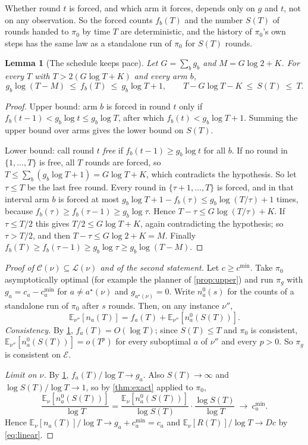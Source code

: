 \documentclass[11pt,a4paper]{article}
\theoremstyle{plain}
\newtheorem{lemma}[theorem]{Lemma}
\theoremstyle{definition}
\theoremstyle{remark}
\newcommand{\E}{\mathbb{E}}
\newcommand{\cmin}{c^{\min}}
\newcommand{\astar}{a^\star}
\newcommand{\Env}{\mathcal{E}}
\begin{document}
Whether round $t$ is forced, and which arm it forces, depends only on $g$ and $t$, not on any observation. So the forced counts $f_b(T)$ and the number $S(T)$ of rounds handed to $\pi_0$ by time $T$ are deterministic, and the history of $\pi_0$'s own steps has the same law as a standalone run of $\pi_0$ for $S(T)$ rounds.

\begin{lemma}[The schedule keeps pace]\label{lem:schedule}
Let $G=\sum_bg_b$ and $M=G\log2+K$. For every $T$ with $T>2(G\log T+K)$ and every arm $b$,
\[
  g_b\log(T-M)\ \le\ f_b(T)\ \le\ g_b\log T+1,\qquad T-G\log T-K\ \le\ S(T)\ \le\ T.
\]
\end{lemma}

\begin{proof}
Upper bound: arm $b$ is forced in round $t$ only if $f_b(t-1)<g_b\log t\le g_b\log T$, after which $f_b(t)<g_b\log T+1$. Summing the upper bound over arms gives the lower bound on $S(T)$.

Lower bound: call round $t$ \emph{free} if $f_b(t-1)\ge g_b\log t$ for all $b$. If no round in $\{1,\dots,T\}$ is free, all $T$ rounds are forced, so $T\le\sum_b(g_b\log T+1)=G\log T+K$, which contradicts the hypothesis. So let $\tau\le T$ be the last free round. Every round in $\{\tau+1,\dots,T\}$ is forced, and in that interval arm $b$ is forced at most $g_b\log T+1-f_b(\tau)\le g_b\log(T/\tau)+1$ times, because $f_b(\tau)\ge f_b(\tau-1)\ge g_b\log\tau$. Hence $T-\tau\le G\log(T/\tau)+K$. If $\tau\le T/2$ this gives $T/2\le G\log T+K$, again contradicting the hypothesis; so $\tau>T/2$, and then $T-\tau\le G\log2+K=M$. Finally $f_b(T)\ge f_b(\tau-1)\ge g_b\log\tau\ge g_b\log(T-M)$.
\end{proof}

\begin{proof}[Proof of $\mathcal C(\nu)\subseteq\mathcal L(\nu)$ and of the second statement]
Let $c\ge\cmin$. Take $\pi_0$ asymptotically optimal (for example the planner of \cref{prop:upper}) and run $\pi_g$ with $g_a=c_a-\cmin_a$ for $a\neq\astar(\nu)$ and $g_{\astar(\nu)}=0$. Write $n^0_a(s)$ for the counts of a standalone run of $\pi_0$ after $s$ rounds. Then, on any instance $\nu''$,
\[
  \E_{\nu''}[n_a(T)]=f_a(T)+\E_{\nu''}[n^0_a(S(T))].
\]
\emph{Consistency.} By \cref{lem:schedule}, $f_a(T)=O(\log T)$; since $S(T)\le T$ and $\pi_0$ is consistent, $\E_{\nu''}[n^0_a(S(T))]=o(T^p)$ for every suboptimal $a$ of $\nu''$ and every $p>0$. So $\pi_g$ is consistent on $\Env$.

\emph{Limit on $\nu$.} By \cref{lem:schedule}, $f_a(T)/\log T\to g_a$. Also $S(T)\to\infty$ and $\log S(T)/\log T\to1$, so by \cref{thm:exact} applied to $\pi_0$,
\[
  \frac{\E_\nu[n^0_a(S(T))]}{\log T}=\frac{\E_\nu[n^0_a(S(T))]}{\log S(T)}\cdot\frac{\log S(T)}{\log T}\ \to\ \cmin_a .
\]
Hence $\E_\nu[n_a(T)]/\log T\to g_a+\cmin_a=c_a$ and $\E_\nu[R(T)]/\log T\to Dc$ by \eqref{eq:linear}.
\end{proof}
\end{document}
